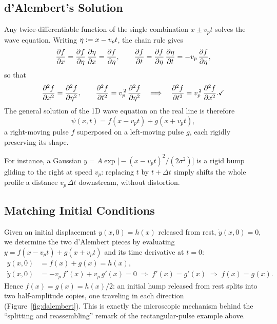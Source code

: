 \subsection{d'Alembert's Solution}

\begin{theorem}[d'Alembert]
Any twice-differentiable function of the single combination $x \pm v_p t$ solves the wave equation. Writing $\eta \vcentcolon= x - v_p t$, the chain rule gives
\begin{equation}
    \pdv{f}{x} = \pdv{f}{\eta}\,\pdv{\eta}{x} = \pdv{f}{\eta},\qquad
    \pdv{f}{t} = \pdv{f}{\eta}\,\pdv{\eta}{t} = -v_p\,\pdv{f}{\eta},
\end{equation}
so that
\begin{equation}
    \pdv[2]{f}{x} = \pdv[2]{f}{\eta}, \qquad \pdv[2]{f}{t} = v_p^{\,2}\,\pdv[2]{f}{\eta} \quad\Longrightarrow\quad \pdv[2]{f}{t} = v_p^{\,2}\,\pdv[2]{f}{x}. \checkmark
\end{equation}
The general solution of the 1D wave equation on the real line is therefore
\begin{equation}
    \psi(x,t) = f(x - v_p t) + g(x + v_p t),
\end{equation}
a right-moving pulse $f$ superposed on a left-moving pulse $g$, each rigidly preserving its shape.
\end{theorem}

For instance, a Gaussian $y = A\exp\bigl[-(x - v_p t)^2/(2\sigma^2)\bigr]$ is a rigid bump gliding to the right at speed $v_p$: replacing $t$ by $t + \Delta t$ simply shifts the whole profile a distance $v_p\,\Delta t$ downstream, without distortion.

\subsection{Matching Initial Conditions}

Given an initial displacement $y(x,0) = h(x)$ released from rest, $\dot y(x,0) = 0$, we determine the two d'Alembert pieces by evaluating $y = f(x - v_p t) + g(x + v_p t)$ and its time derivative at $t=0$:
\begin{align}
    y(x,0) &= f(x) + g(x) = h(x), \\
    \dot y(x,0) &= -v_p\,f'(x) + v_p\,g'(x) = 0 \;\Longrightarrow\; f'(x) = g'(x) \;\Longrightarrow\; f(x) = g(x).
\end{align}
Hence $f(x) = g(x) = h(x)/2$: an initial hump released from rest splits into two half-amplitude copies, one traveling in each direction (Figure~\ref{fig:dalembert}). This is exactly the microscopic mechanism behind the ``splitting and reassembling'' remark of the rectangular-pulse example above.

